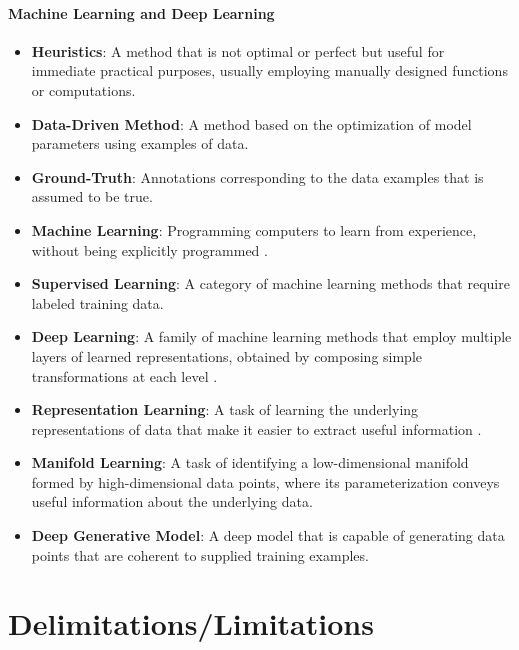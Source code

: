 \paragraph{Machine Learning and Deep Learning}

\begin{itemize}
	\item \textbf{Heuristics}: A method that is not optimal or perfect but useful for immediate practical purposes, usually employing manually designed functions or computations.
	\item \textbf{Data-Driven Method}: A method based on the optimization of model parameters using examples of data.
	\item \textbf{Ground-Truth}: Annotations corresponding to the data examples that is assumed to be true.
	\item \textbf{Machine Learning}: Programming computers to learn from experience, without being explicitly programmed \cite{samuel1959ml}.
	\item \textbf{Supervised Learning}: A category of machine learning methods that require labeled training data.
	\item \textbf{Deep Learning}: A family of machine learning methods that employ multiple layers of learned representations, obtained by composing simple transformations at each level \cite{lecun2015deeplearning}.
	\item \textbf{Representation Learning}: A task of learning the underlying representations of data that make it easier to extract useful information \cite{bengio2013representation}.
	\item \textbf{Manifold Learning}: A task of identifying a low-dimensional manifold formed by high-dimensional data points, where its parameterization conveys useful information about the underlying data.
	\item \textbf{Deep Generative Model}: A deep model that is capable of generating data points that are coherent to supplied training examples.
\end{itemize}

\section{Delimitations/Limitations}

